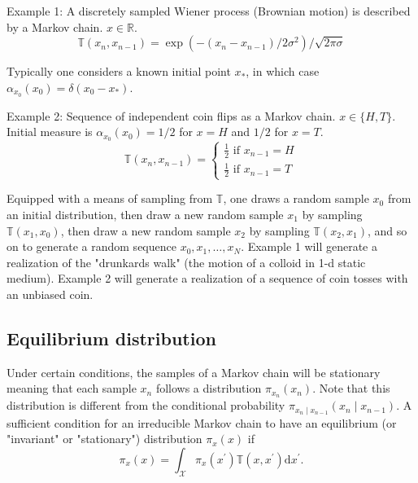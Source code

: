 \documentclass[11pt]{article}
\begin{document}
Example 1: A discretely sampled Wiener process (Brownian motion) is described by a Markov chain. $x \in \mathbb{R}$.
\begin{equation}
\mathbb{T}\left(x_{n}, x_{n-1}\right)=\exp \left(-\left(x_{n}-x_{n-1}\right) / 2 \sigma^{2}\right) / \sqrt{2 \pi \sigma}
\end{equation}

Typically one considers a known initial point $x_{*}$, in which case $\alpha_{x_{0}}\left(x_{0}\right)=\delta\left(x_{0}-x_{*}\right)$.

Example 2: Sequence of independent coin flips as a Markov chain. $x \in\{H, T\}$. Initial measure is $\alpha_{x_{0}}\left(x_{0}\right)=1 / 2$ for $x=H$ and $1 / 2$ for $x=T$.
\begin{equation}
\mathbb{T}\left(x_{n}, x_{n-1}\right)=\left\{\begin{array}{l}
	\frac{1}{2} \text { if } x_{n-1}=H \\
	\frac{1}{2} \text { if } x_{n-1}=T
\end{array}\right.
\end{equation}

Equipped with a means of sampling from $\mathbb{T}$, one draws a random sample $x_{0}$ from an initial distribution, then draw a new random sample $x_{1}$ by sampling $\mathbb{T}\left(x_{1}, x_{0}\right)$, then draw a new random sample $x_{2}$ by sampling $\mathbb{T}\left(x_{2}, x_{1}\right)$, and so on to generate a random sequence $x_{0}, x_{1}, \ldots, x_{N}$. Example 1 will generate a realization of the "drunkards walk" (the motion of a colloid in 1-d static medium). Example 2 will generate a realization of a sequence of coin tosses with an unbiased coin.

\subsection{Equilibrium distribution}

Under certain conditions, the samples of a Markov chain will be stationary meaning that each sample $x_{n}$ follows a distribution $\pi_{x_{n}}\left(x_{n}\right)$. Note that this distribution is different from the conditional probability $\pi_{x_{n} \mid x_{n-1}}\left(x_{n} \mid x_{n-1}\right)$. A sufficient condition for an irreducible Markov chain to have an equilibrium (or "invariant" or "stationary") distribution $\pi_{x}(x)$ if
\begin{equation}
\pi_{x}(x)=\int_{\mathcal{X}} \pi_{x}\left(x^{\prime}\right) \mathbb{T}\left(x, x^{\prime}\right) \mathrm{d} x^{\prime} .
\end{equation}
\end{document}

